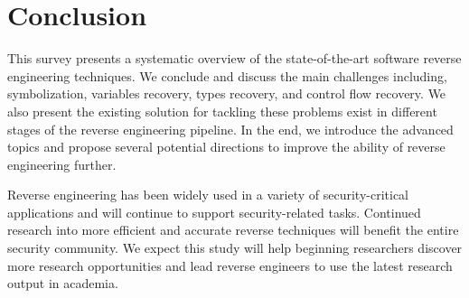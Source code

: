 \chapter{Conclusion}\label{sec-conclusion}

This survey presents a systematic overview of the state-of-the-art software 
reverse engineering techniques. We conclude and discuss the main challenges 
including, symbolization, variables recovery, types recovery, and control flow 
recovery.
We also present the existing solution for tackling these problems exist in 
different stages of the reverse engineering pipeline. In the end, we introduce 
the advanced topics and propose several potential directions to improve the 
ability of reverse engineering further.

Reverse engineering has been widely used in a variety of security-critical 
applications and will continue to support security-related tasks. Continued 
research into more efficient and accurate reverse techniques will benefit the 
entire security community. We expect this study will help beginning researchers 
discover more research opportunities and lead reverse engineers to use the 
latest research output in academia.

\newpage
